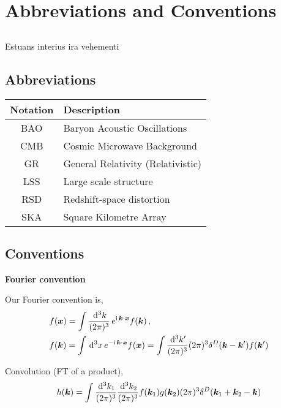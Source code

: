 \chapter*{Abbreviations and Conventions}
\label{chapter:conventions}
\section*{}
\singlespacing

Estuans interius ira vehementi

\section*{Abbreviations}
\setlength{\tabcolsep}{14pt}
\begin{center}
\begin{tabular}{c | l}
	\textbf{Notation} & \textbf{Description} \\
	\hline
	BAO & Baryon Acoustic Oscillations \\
	CMB & Cosmic Microwave Background \\
	GR & General Relativity (Relativistic) \\
	LSS & Large scale structure \\
	RSD & Redshift-space distortion \\
	SKA & Square Kilometre Array
\end{tabular}
\end{center}
\section*{Conventions}

\textbf{Fourier convention}


Our Fourier convention is, 
\begin{align*}
	&f(\bm {x}) = \int \frac{\,\mathrm{d}^3 k}{(2\pi)^3}\, e^{\mathrm{i\,} \bm {k} \cdot \bm {x}} f(\bm {k})\,,\\
	&f(\bm {k}) = \int \,\mathrm{d}^3x\, e^{- \mathrm{i\,} \bm {k}\cdot\bm {x}} f(\bm {x}) = \int \frac{\,\mathrm{d}^3 k'}{(2\pi)^3} (2\pi)^3 \delta^D(\bm {k}-\bm {k}') f(\bm {k}')
\end{align*}

Convolution (FT of a product), 
\begin{equation}
	h(\bm {k}) = \int \frac{\,\mathrm{d}^3k_1}{(2\pi)^3} \frac{\,\mathrm{d}^3k_2}{(2\pi)^3} f(\bm {k}_1) g(\bm {k}_2) (2\pi)^3 \delta^D(\bm {k}_1 +\bm {k}_2 - \bm {k})
\end{equation}



